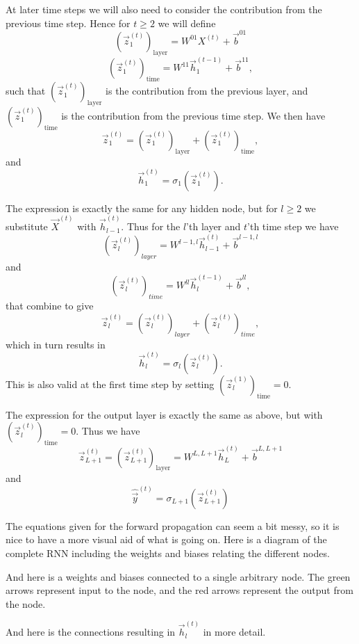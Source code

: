 \documentclass[11pt]{article}
\begin{document}
    At later time steps we will also need to consider the contribution from
the previous time step. Hence for \(t \geq 2\) we will define
\[\left( \vec{z}_1^{(t)} \right)_\text{layer} = W^{01} X^{(t)} + \vec{b}^{01}\]
\[\left( \vec{z}_1^{(t)} \right)_\text{time} = W^{11} \vec{h}_1^{(t-1)} + \vec{b}^{11},\]
such that \(\left( \vec{z}_1^{(t)} \right)_\text{layer}\) is the
contribution from the previous layer, and
\(\left( \vec{z}_1^{(t)} \right)_\text{time}\) is the contribution from
the previous time step. We then have
\[\vec{z}_1^{(t)} = \left( \vec{z}_1^{(t)} \right)_\text{layer} + \left( \vec{z}_1^{(t)} \right)_\text{time},\]
and \[\vec{h}_1^{(t)} = \sigma_1 \left( \vec{z}_1^{(t)} \right).\]

    The expression is exactly the same for any hidden node, but for
\(l \geq 2\) we substitute \(\vec{X}^{(t)}\) with
\(\vec{h}_{l-1}^{(t)}\). Thus for the \(l\)'th layer and \(t\)'th time
step we have
\[ \left( \vec{z}_l^{(t)} \right)_{layer} = W^{l-1,l} \vec{h}_{l-1}^{(t)} + \vec{b}^{l-1,l} \]
and
\[ \left( \vec{z}_l^{(t)} \right)_{time} = W^{ll} \vec{h}_{l}^{(t-1)} + \vec{b}^{ll}, \]
that combine to give
\[ \vec{z}_l^{(t)} = \left( \vec{z}_l^{(t)} \right)_{layer} + \left( \vec{z}_l^{(t)} \right)_{time}, \]
which in turn results in
\[ \vec{h}_l^{(t)} = \sigma_l \left( \vec{z}_l^{(t)} \right). \] This is
also valid at the first time step by setting
\(\left( \vec{z}_l^{(1)} \right)_\text{time} = 0\).

    The expression for the output layer is exactly the same as above, but
with \(\left( \vec{z}_l^{(t)} \right)_\text{time} = 0\). Thus we have
\[ \vec{z}_{L+1}^{(t)} = \left( \vec{z}_{L+1}^{(t)} \right)_\text{layer} = W^{L,L+1} \vec{h}_L^{(t)} + \vec{b}^{L,L+1} \]
and
\[ \hat{\vec{y}}^{(t)} = \sigma_{L+1} \left( \vec{z}_{L+1}^{(t)} \right) \]

    The equations given for the forward propagation can seem a bit messy, so
it is nice to have a more visual aid of what is going on. Here is a
diagram of the complete RNN including the weights and biases relating
the different nodes.

    

    And here is a weights and biases connected to a single arbitrary node.
The green arrows represent input to the node, and the red arrows
represent the output from the node.

    

    And here is the connections resulting in \(\vec{h}_l^{(t)}\) in more
detail.

    
\end{document}
